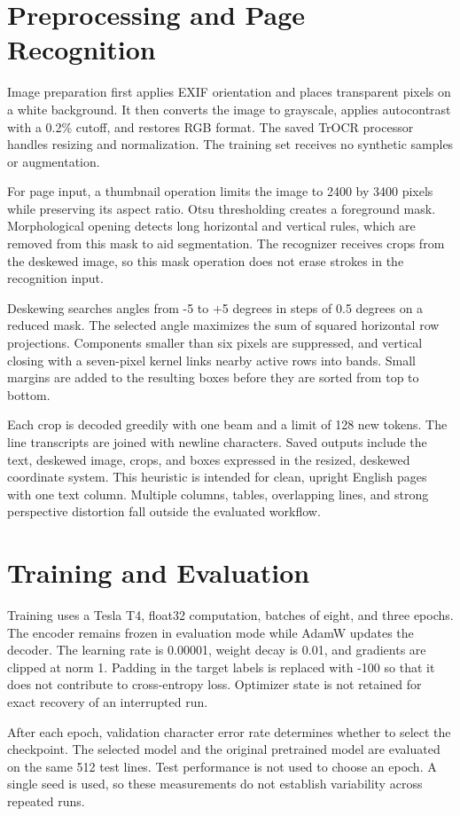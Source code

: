 \documentclass[conference]{IEEEtran}
\begin{document}
\section{Preprocessing and Page Recognition}
Image preparation first applies EXIF orientation and places transparent pixels on a white background. It then converts the image to grayscale, applies autocontrast with a 0.2\% cutoff, and restores RGB format. The saved TrOCR processor handles resizing and normalization. The training set receives no synthetic samples or augmentation.

For page input, a thumbnail operation limits the image to 2400 by 3400 pixels while preserving its aspect ratio. Otsu thresholding creates a foreground mask. Morphological opening detects long horizontal and vertical rules, which are removed from this mask to aid segmentation. The recognizer receives crops from the deskewed image, so this mask operation does not erase strokes in the recognition input.

Deskewing searches angles from -5 to +5 degrees in steps of 0.5 degrees on a reduced mask. The selected angle maximizes the sum of squared horizontal row projections. Components smaller than six pixels are suppressed, and vertical closing with a seven-pixel kernel links nearby active rows into bands. Small margins are added to the resulting boxes before they are sorted from top to bottom.

Each crop is decoded greedily with one beam and a limit of 128 new tokens. The line transcripts are joined with newline characters. Saved outputs include the text, deskewed image, crops, and boxes expressed in the resized, deskewed coordinate system. This heuristic is intended for clean, upright English pages with one text column. Multiple columns, tables, overlapping lines, and strong perspective distortion fall outside the evaluated workflow.
\section{Training and Evaluation}
Training uses a Tesla T4, float32 computation, batches of eight, and three epochs. The encoder remains frozen in evaluation mode while AdamW updates the decoder. The learning rate is 0.00001, weight decay is 0.01, and gradients are clipped at norm 1. Padding in the target labels is replaced with -100 so that it does not contribute to cross-entropy loss. Optimizer state is not retained for exact recovery of an interrupted run.

After each epoch, validation character error rate determines whether to select the checkpoint. The selected model and the original pretrained model are evaluated on the same 512 test lines. Test performance is not used to choose an epoch. A single seed is used, so these measurements do not establish variability across repeated runs.
\end{document}
